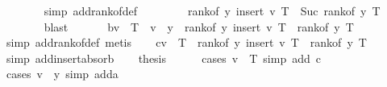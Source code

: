 \begin{isabellebody}
\ \ \ \ \ \ \isamarkupfalse%
\ {\isacharparenleft}{\kern0pt}simp\ add{\isacharcolon}{\kern0pt}rank{\isacharunderscore}{\kern0pt}of{\isacharunderscore}{\kern0pt}def{\isacharparenright}{\kern0pt}\ \isanewline
\ \ \ \ \isamarkupfalse%
\ \isamarkupfalse%
\ {\isachardoublequoteopen}rank{\isacharunderscore}{\kern0pt}of\ y\ {\isacharparenleft}{\kern0pt}insert\ v\ T{\isacharparenright}{\kern0pt}\ {\isacharequal}{\kern0pt}\ Suc\ {\isacharparenleft}{\kern0pt}rank{\isacharunderscore}{\kern0pt}of\ y\ T{\isacharparenright}{\kern0pt}{\isachardoublequoteclose}\isanewline
\ \ \ \ \ \ \isamarkupfalse%
\ blast\isanewline
\ \ \isamarkupfalse%
\isanewline
\ \ \isamarkupfalse%
\ b{\isacharcolon}{\kern0pt}{\isachardoublequoteopen}v\ {\isasymnotin}\ T\ {\isasymLongrightarrow}\ {\isasymnot}{\isacharparenleft}{\kern0pt}v\ {\isacharless}{\kern0pt}\ y{\isacharparenright}{\kern0pt}\ {\isasymLongrightarrow}\ rank{\isacharunderscore}{\kern0pt}of\ y\ {\isacharparenleft}{\kern0pt}insert\ v\ T{\isacharparenright}{\kern0pt}\ {\isacharequal}{\kern0pt}\ rank{\isacharunderscore}{\kern0pt}of\ y\ T{\isachardoublequoteclose}\isanewline
\ \ \ \ \isamarkupfalse%
\ {\isacharparenleft}{\kern0pt}simp\ add{\isacharcolon}{\kern0pt}rank{\isacharunderscore}{\kern0pt}of{\isacharunderscore}{\kern0pt}def{\isacharcomma}{\kern0pt}\ metis{\isacharparenright}{\kern0pt}\isanewline
\ \ \isamarkupfalse%
\ c{\isacharcolon}{\kern0pt}{\isachardoublequoteopen}v\ {\isasymin}\ T\ {\isasymLongrightarrow}\ rank{\isacharunderscore}{\kern0pt}of\ y\ {\isacharparenleft}{\kern0pt}insert\ v\ T{\isacharparenright}{\kern0pt}\ {\isacharequal}{\kern0pt}\ rank{\isacharunderscore}{\kern0pt}of\ y\ T{\isachardoublequoteclose}\isanewline
\ \ \ \ \isamarkupfalse%
\ {\isacharparenleft}{\kern0pt}simp\ add{\isacharcolon}{\kern0pt}insert{\isacharunderscore}{\kern0pt}absorb{\isacharparenright}{\kern0pt}\isanewline
\isanewline
\ \ \isamarkupfalse%
\ {\isacharquery}{\kern0pt}thesis\isanewline
\ \ \ \ \isamarkupfalse%
\ {\isacharparenleft}{\kern0pt}cases\ {\isachardoublequoteopen}v\ {\isasymin}\ T{\isachardoublequoteclose}{\isacharcomma}{\kern0pt}\ simp\ add{\isacharcolon}{\kern0pt}\ c{\isacharparenright}{\kern0pt}\isanewline
\ \ \ \ \isamarkupfalse%
\ {\isacharparenleft}{\kern0pt}cases\ {\isachardoublequoteopen}v\ {\isacharless}{\kern0pt}\ y{\isachardoublequoteclose}{\isacharcomma}{\kern0pt}\ simp\ add{\isacharcolon}{\kern0pt}a{\isacharparenright}{\kern0pt}\isanewline

\end{isabellebody}
